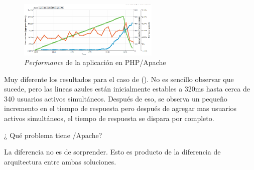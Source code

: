 

\begin{figure}[h!]
	\centering
	\includegraphics[width=0.6\textwidth]{figuras/cap2/phpapache_benchmak_loadimpact.png}
	\caption{\textit{Performance} de la aplicación en PHP/Apache}
	\label{figure:php_benchmark_nodephp}
\end{figure}

Muy diferente los resultados para el caso de \php(). No es sencillo observar que sucede, pero las lineas azules están inicialmente estables a 320ms hasta cerca de 340 usuarios activos simultáneos. Después de eso, se observa un pequeño incremento en el tiempo de respuesta pero después de agregar mas usuarios activos simultáneos, el tiempo de respuesta se dispara por completo. 

¿ Qué problema tiene \php/Apache?

La diferencia no es de sorprender. Esto es producto de la diferencia de arquitectura entre ambas soluciones.

